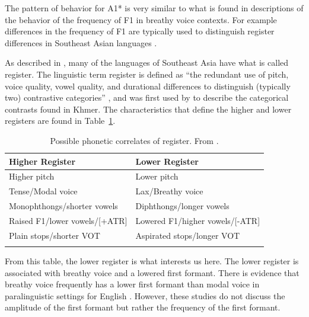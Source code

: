 The pattern of behavior for A1* is very similar to what is found in descriptions of the behavior of the frequency of F1 in breathy voice contexts. For example differences in the frequency of F1 are typically used to distinguish register differences in Southeast Asian languages \citep{brunelleRegisterEasternCham2005,brunelleDialectExperiencePerceptual2012,brunelleTonePhonationSoutheast2016}.

As described in \citet{brunelleTonePhonationSoutheast2016}, many of the languages of Southeast Asia have what is called register. The linguistic term register is defined as ``the redundant use of pitch, voice quality, vowel quality, and durational differences to distinguish (typically two) contrastive categories'' \citep[193]{brunelleTonePhonationSoutheast2016}, and was first used by \citet{hendersonMainFeaturesCambodian1952} to describe the categorical contrasts found in Khmer. The characteristics that define the higher and lower registers are found in Table~\ref{tab:register_correlates}.

\begin{table}[h!]
    \centering
    \caption{Possible phonetic correlates of register. From \citet{brunelleTonePhonationSoutheast2016}.}
    \label{tab:register_correlates}
    \begin{tabular}{ll}
        \lsptoprule
        \textbf{Higher Register} & \textbf{Lower Register} \\
        \hline
        Higher pitch & Lower pitch \\
        Tense/Modal voice & Lax/Breathy voice \\
        Monophthongs/shorter vowels & Diphthongs/longer vowels \\
        Raised F1/lower vowels/[+ATR] & Lowered F1/higher vowels/[-ATR] \\
        Plain stops/shorter VOT & Aspirated stops/longer VOT \\
        \lspbottomrule
    \end{tabular}
\end{table}

From this table, the lower register is what interests us here. The lower register is associated with breathy voice and a lowered first formant. There is evidence that breathy voice frequently has a lower first formant than modal voice in paralinguistic settings for English \citep{lottoEffectVoiceQuality1997}.  However, these studies do not discuss the amplitude of the first formant but rather the frequency of the first formant.

